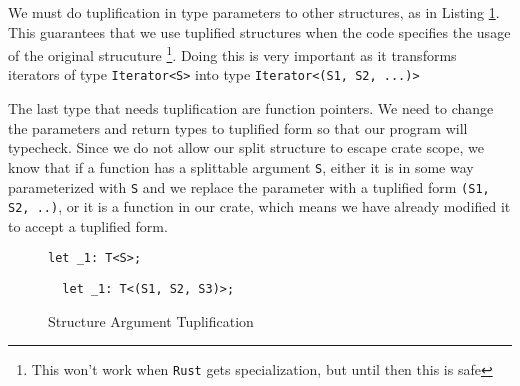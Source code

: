 \documentclass[prodmode,acmtecs]{acmsmall} %
\newcommand{\rustname}{{\texttt{Rust}}}
\def \rust {\rustname{}\xspace}
\begin{document}
We must do tuplification in type parameters to other structures,
as in Listing \ref{fig:localdeclbefore}.
This guarantees that we use tuplified structures
when the code specifies the usage of the original strucuture
\footnote{This won't work when \rust gets specialization, 
but until then this is safe}.
Doing this is very important as it transforms iterators
of type \texttt{Iterator<S>} into type \texttt{Iterator<(S1, S2, ...)>}

The last type that needs tuplification are function pointers. We 
need to change the parameters and return types to tuplified form
so that our program will typecheck. Since we do not allow our split structure
to escape crate scope, we know that if a function has a splittable
argument \texttt{S}, either it is in some way parameterized with
\texttt{S} and we replace the parameter with a tuplified form
\texttt{(S1, S2, ..)}, or it is a function in our crate, which
means we have already modified it to accept a tuplified form.

\begin{figure}[p]
  \begin{minipage}[t]{0.5\linewidth}
\begin{verbatim}
let _1: T<S>;
\end{verbatim}
  \end{minipage}
  \begin{minipage}[t]{0.5\linewidth}
\begin{verbatim}
  let _1: T<(S1, S2, S3)>;
\end{verbatim}
  \end{minipage}
  \caption{Structure Argument Tuplification}
  \label{fig:localdeclbefore}
\end{figure}
\end{document}
